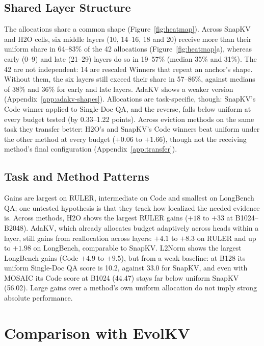 \documentclass[11pt]{article}
\begin{document}
\subsection{Shared Layer Structure}
\label{sec:shared}

The allocations share a common shape (Figure~\ref{fig:heatmap}). Across SnapKV and H2O cells, six middle layers (10, 14--16, 18 and 20) receive more than their uniform share in 64--83\% of the 42 allocations (Figure~\ref{fig:heatmap}a), whereas early (0--9) and late (21--29) layers do so in 19--57\% (median 35\% and 31\%). The 42 are not independent: 14 are rescaled Winners that repeat an anchor's shape. Without them, the six layers still exceed their share in 57--86\%, against medians of 38\% and 36\% for early and late layers. AdaKV shows a weaker version (Appendix~\ref{app:adakv-shapes}). Allocations are task-specific, though: SnapKV's Code winner applied to Single-Doc QA, and the reverse, falls below uniform at every budget tested (by 0.33--1.22 points). Across eviction methods on the same task they transfer better: H2O's and SnapKV's Code winners beat uniform under the other method at every budget ($+0.06$ to $+1.66$), though not the receiving method's final configuration (Appendix~\ref{app:transfer}).

\subsection{Task and Method Patterns}

Gains are largest on RULER, intermediate on Code and smallest on LongBench QA; one untested hypothesis is that they track how localized the needed evidence is. Across methods, H2O shows the largest RULER gains ($+18$ to $+33$ at B1024--B2048). AdaKV, which already allocates budget adaptively across heads within a layer, still gains from reallocation across layers: $+4.1$ to $+8.3$ on RULER and up to $+1.98$ on LongBench, comparable to SnapKV. L2Norm shows the largest LongBench gains (Code $+4.9$ to $+9.5$), but from a weak baseline: at B128 its uniform Single-Doc QA score is 10.2, against 33.0 for SnapKV, and even with MOSAIC its Code score at B1024 (44.47) stays far below uniform SnapKV (56.02). Large gains over a method's own uniform allocation do not imply strong absolute performance.

\section{Comparison with EvolKV}
\label{sec:evolkv}
\end{document}
